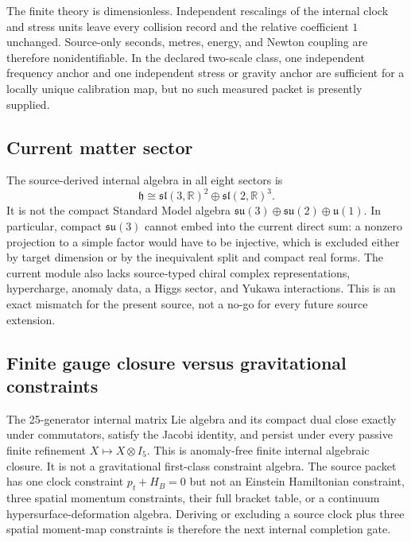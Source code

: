 \documentclass[11pt]{article}
\theoremstyle{definition}
\theoremstyle{remark}
\begin{document}
The finite theory is dimensionless. Independent rescalings of the internal clock and stress units leave every collision record and the relative coefficient $1$ unchanged. Source-only seconds, metres, energy, and Newton coupling are therefore nonidentifiable. In the declared two-scale class, one independent frequency anchor and one independent stress or gravity anchor are sufficient for a locally unique calibration map, but no such measured packet is presently supplied.

\subsection{Current matter sector}

The source-derived internal algebra in all eight sectors is
\begin{equation}
 \mathfrak h\cong
 \mathfrak{sl}(3,\mathbb R)^2\oplus
 \mathfrak{sl}(2,\mathbb R)^3.
\end{equation}
It is not the compact Standard Model algebra
$\mathfrak{su}(3)\oplus\mathfrak{su}(2)\oplus\mathfrak u(1)$. In particular, compact $\mathfrak{su}(3)$ cannot embed into the current direct sum: a nonzero projection to a simple factor would have to be injective, which is excluded either by target dimension or by the inequivalent split and compact real forms. The current module also lacks source-typed chiral complex representations, hypercharge, anomaly data, a Higgs sector, and Yukawa interactions. This is an exact mismatch for the present source, not a no-go for every future source extension.

\subsection{Finite gauge closure versus gravitational constraints}

The 25-generator internal matrix Lie algebra and its compact dual close exactly under commutators, satisfy the Jacobi identity, and persist under every passive finite refinement $X\mapsto X\otimes I_5$. This is anomaly-free finite internal algebraic closure. It is not a gravitational first-class constraint algebra. The source packet has one clock constraint $p_t+H_B=0$ but not an Einstein Hamiltonian constraint, three spatial momentum constraints, their full bracket table, or a continuum hypersurface-deformation algebra. Deriving or excluding a source clock plus three spatial moment-map constraints is therefore the next internal completion gate.
\end{document}
